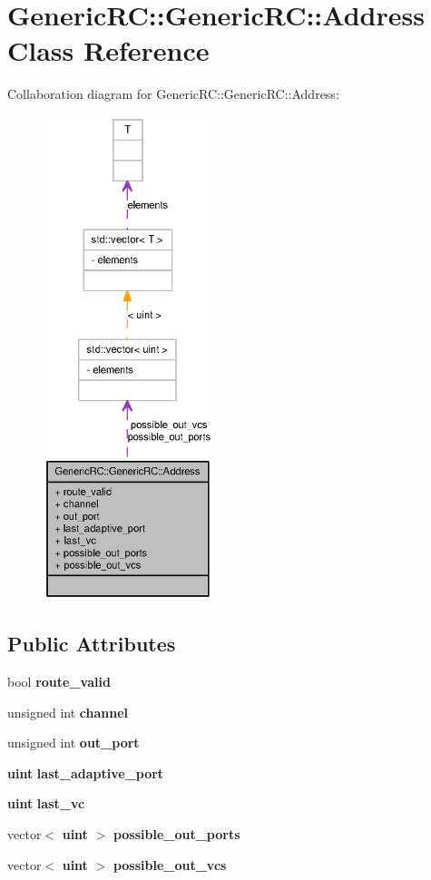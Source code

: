 \section{GenericRC::GenericRC::Address Class Reference}
\label{classGenericRC_1_1Address}
Collaboration diagram for GenericRC::GenericRC::Address:\nopagebreak
\begin{figure}[H]
\begin{center}
\leavevmode
\includegraphics[height=400pt]{classGenericRC_1_1Address__coll__graph}
\end{center}
\end{figure}
\subsection*{Public Attributes}
\begin{CompactItemize}
\item 
bool {\bf route\_\-valid}
\item 
unsigned int {\bf channel}
\item 
unsigned int {\bf out\_\-port}
\item 
{\bf uint} {\bf last\_\-adaptive\_\-port}
\item 
{\bf uint} {\bf last\_\-vc}
\item 
vector$<$ {\bf uint} $>$ {\bf possible\_\-out\_\-ports}
\item 
vector$<$ {\bf uint} $>$ {\bf possible\_\-out\_\-vcs}
\end{CompactItemize}


